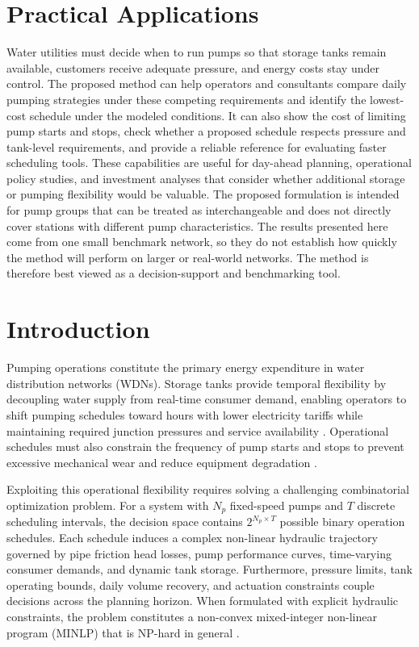 \documentclass[Journal,letterpaper,InsideFigs]{ascelike-new}
\begin{document}
\section{Practical Applications}
Water utilities must decide when to run pumps so that storage tanks remain available, customers receive adequate pressure, and energy costs stay under control. The proposed method can help operators and consultants compare daily pumping strategies under these competing requirements and identify the lowest-cost schedule under the modeled conditions. It can also show the cost of limiting pump starts and stops, check whether a proposed schedule respects pressure and tank-level requirements, and provide a reliable reference for evaluating faster scheduling tools. These capabilities are useful for day-ahead planning, operational policy studies, and investment analyses that consider whether additional storage or pumping flexibility would be valuable. The proposed formulation is intended for pump groups that can be treated as interchangeable and does not directly cover stations with different pump characteristics. The results presented here come from one small benchmark network, so they do not establish how quickly the method will perform on larger or real-world networks. The method is therefore best viewed as a decision-support and benchmarking tool.

\section{Introduction}

Pumping operations constitute the primary energy expenditure in water distribution networks (WDNs). Storage tanks provide temporal flexibility by decoupling water supply from real-time consumer demand, enabling operators to shift pumping schedules toward hours with lower electricity tariffs while maintaining required junction pressures and service availability \cite{Reis2023,Paola2024}. Operational schedules must also constrain the frequency of pump starts and stops to prevent excessive mechanical wear and reduce equipment degradation \cite{Lansey1994,Costa2016}.

Exploiting this operational flexibility requires solving a challenging combinatorial optimization problem. For a system with $N_p$ fixed-speed pumps and $T$ discrete scheduling intervals, the decision space contains $2^{N_p \times T}$ possible binary operation schedules. Each schedule induces a complex non-linear hydraulic trajectory governed by pipe friction head losses, pump performance curves, time-varying consumer demands, and dynamic tank storage. Furthermore, pressure limits, tank operating bounds, daily volume recovery, and actuation constraints couple decisions across the planning horizon. When formulated with explicit hydraulic constraints, the problem constitutes a non-convex mixed-integer non-linear program (MINLP) that is NP-hard in general \cite{Fooladivanda2018,Verleye2016,Bonvin2021}.
\end{document}

